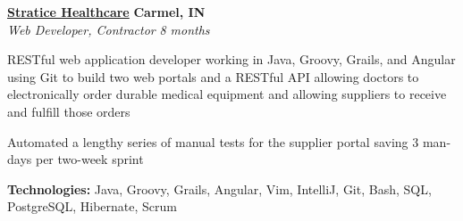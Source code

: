 %
    \headerrow
        {\textbf{\href{https://www.straticehealthcare.com/}{Stratice Healthcare}}}
        {\textbf{Carmel, IN}}
    \\
    \headerrow
        {\emph{Web Developer, Contractor}}
        {\emph{8 months}}
    \begin{itemize*}
        \item RESTful web application developer working in Java, Groovy, Grails, and Angular using Git to build two
            web portals and a RESTful API allowing doctors to electronically order durable medical equipment and
            allowing suppliers to receive and fulfill those orders
        \item Automated a lengthy series of manual tests for the supplier portal saving 3 man-days per two-week sprint
    \end{itemize*}

    \hspace{1.0em}
        {\textbf{Technologies:} Java, Groovy, Grails, Angular, Vim, IntelliJ, Git, Bash, SQL, PostgreSQL, Hibernate, Scrum}
